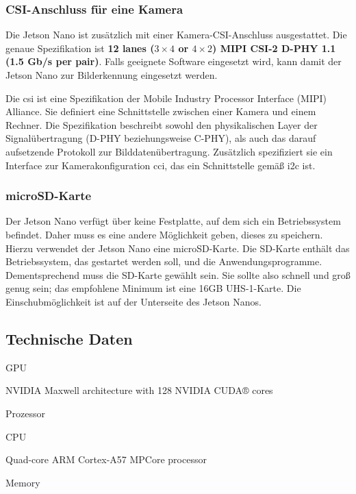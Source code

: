 \subsubsection{CSI-Anschluss für eine Kamera}

Die Jetson Nano ist zusätzlich mit einer Kamera-CSI-Anschluss ausgestattet. 
Die genaue Spezifikation ist \textbf{12 lanes ($3\times 4$ or $4 \times 2$) MIPI CSI-2 D-PHY 1.1 (1.5 Gb/s per pair)}. Falls geeignete Software eingesetzt wird, kann damit der Jetson Nano zur Bilderkennung eingesetzt werden.

Die \ac{csi} ist eine Spezifikation der Mobile Industry Processor Interface (MIPI) Alliance. Sie definiert eine Schnittstelle zwischen einer Kamera und einem Rechner. \cite{csi2:2018,csi2:2019} Die Spezifikation beschreibt sowohl den physikalischen Layer der Signalübertragung (D-PHY beziehungsweise C-PHY), als auch das darauf aufsetzende Protokoll zur Bilddatenübertragung. Zusätzlich spezifiziert sie ein Interface zur Kamerakonfiguration \ac{cci}, das ein Schnittstelle gemäß \ac{i2c} ist.


\subsubsection{microSD-Karte}


Der Jetson Nano verfügt über keine Festplatte, auf dem sich ein Betriebssystem befindet.
Daher muss es eine andere Möglichkeit geben, dieses zu speichern. Hierzu verwendet der Jetson Nano 
eine microSD-Karte. Die SD-Karte enthält das Betriebssystem, das gestartet werden soll, und die Anwendungsprogramme. Dementsprechend muss die SD-Karte gewählt sein. Sie sollte also  schnell und groß genug sein; das empfohlene Minimum ist eine 16GB UHS-1-Karte. Die Einschubmöglichkeit ist auf der Unterseite des Jetson Nanos. 




\subsection{Technische Daten}



GPU

NVIDIA Maxwell architecture with 128 NVIDIA CUDA® cores


Prozessor

CPU

Quad-core ARM Cortex-A57 MPCore processor 


Memory


